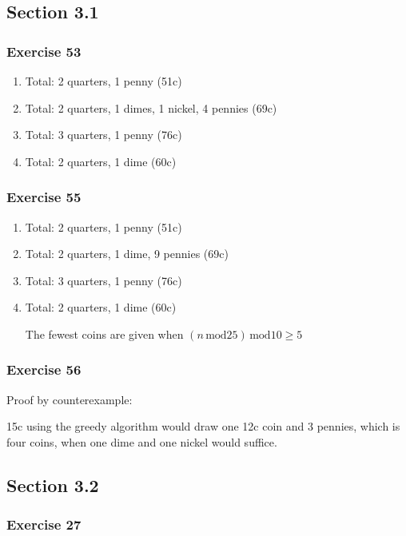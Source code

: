 \documentclass[a4paper]{article}
\newcommand{\ex}[1]{\subsubsection*{#1}}
\begin{document}
\pagestyle{fancy} %



\subsection*{Section 3.1}
\ex{Exercise 53}

\begin{enumerate}[label=\alph*)]
    \item Total: 2 quarters, 1 penny (51c)

    \item Total: 2 quarters, 1 dimes, 1 nickel, 4 pennies (69c)

    \item Total: 3 quarters, 1 penny (76c)

    \item Total: 2 quarters, 1 dime (60c)
\end{enumerate}


\ex{Exercise 55}

\begin{enumerate}[label=\alph*)]
    \item Total: 2 quarters, 1 penny (51c)

    \item Total: 2 quarters, 1 dime, 9 pennies (69c)

    \item Total: 3 quarters, 1 penny (76c)

    \item Total: 2 quarters, 1 dime (60c)

        The fewest coins are given when \((n \, \mathrm{mod}25) \, \mathrm{mod} 10 \geq 5\)

\end{enumerate}


\ex{Exercise 56}

Proof by counterexample:

15c using the greedy algorithm would draw one 12c coin and 3 pennies, which is four coins, when one dime and one nickel would suffice. 


\subsection{Section 3.2}
\ex{Exercise 27}
\end{document}

